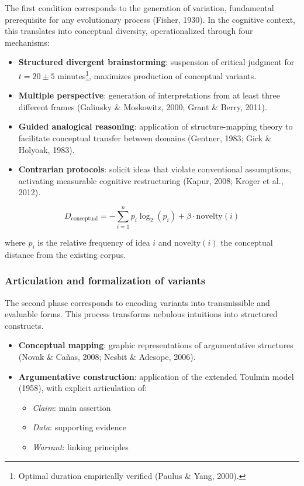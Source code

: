 The first condition corresponds to the generation of variation, fundamental 
prerequisite for any evolutionary process (Fisher, 1930). In the cognitive context, 
this translates into conceptual diversity, operationalized through four mechanisms:

\begin{itemize}
	\item \textbf{Structured divergent brainstorming}: suspension of critical judgment 
	for $t = 20 \pm 5$ minutes\footnote{Optimal duration empirically verified (Paulus \& Yang, 2000).}, 
	maximizes production of conceptual variants.
	\item \textbf{Multiple perspective}: generation of interpretations from at least three 
	different frames (Galinsky \& Moskowitz, 2000; Grant \& Berry, 2011).
	\item \textbf{Guided analogical reasoning}: application of structure-mapping 
	theory to facilitate conceptual transfer between domains (Gentner, 1983; Gick \& Holyoak, 1983).
	\item \textbf{Contrarian protocols}: solicit ideas that violate conventional assumptions, 
	activating measurable cognitive restructuring (Kapur, 2008; Kroger et al., 2012).
\end{itemize}

\begin{equation}
	D_{\text{conceptual}} = -\sum_{i=1}^{n} p_i \log_2(p_i) + 
	\beta \cdot \text{novelty}(i)
	\label{eq:diversity}
\end{equation}

where $p_i$ is the relative frequency of idea $i$ and $\text{novelty}(i)$ the conceptual distance from the existing corpus.

\subsubsection{Articulation and formalization of variants}

The second phase corresponds to encoding variants into transmissible and evaluable forms. 
This process transforms nebulous intuitions into structured constructs.

\begin{itemize}
	\item \textbf{Conceptual mapping}: graphic representations of argumentative structures 
	(Novak \& Cañas, 2008; Nesbit \& Adesope, 2006).
	\item \textbf{Argumentative construction}: application of the extended Toulmin model (1958), 
	with explicit articulation of:
	\begin{itemize}
		\item \textit{Claim}: main assertion
		\item \textit{Data}: supporting evidence
		\item \textit{Warrant}: linking principles
	\end{itemize}
\end{itemize}

